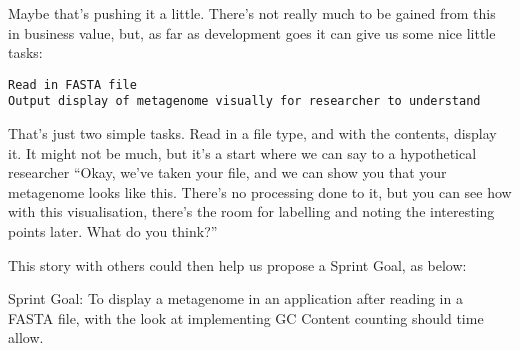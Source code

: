 Maybe that’s pushing it a little. There’s not really much to be gained from this in business value, but, as far as development goes it can give us some nice little tasks:
\begin{verbatim}
Read in FASTA file
Output display of metagenome visually for researcher to understand
\end{verbatim}
That’s just two simple tasks. Read in a file type, and with the contents, display it. It might not be much, but it’s a start where we can say to a hypothetical researcher “Okay, we’ve taken your file, and we can show you that your metagenome looks like this. There’s no processing done to it, but you can see how with this visualisation, there’s the room for labelling and noting the interesting points later. What do you think?”

This story with others could then help us propose a Sprint Goal, as below:

Sprint Goal:
To display a metagenome in an application after reading in a FASTA file, with the look at implementing GC Content counting should time allow.

